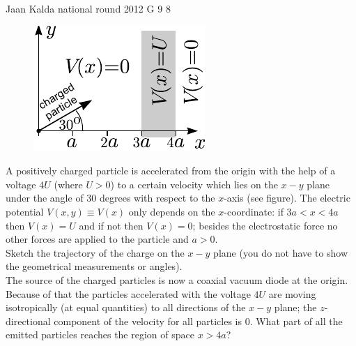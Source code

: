 \documentclass[11pt]{article}
\begin{document}
{Jaan Kalda} %
{national round} %
{2012} %
{G 9} %
{8} %
{

\ifEngStatement
\begin{figure}%
\vspace{-10pt}
\includegraphics[width=\linewidth]{2012-v3g-09-laeng_ing}%
\end{figure}
A positively charged particle is accelerated from the origin with the help of a voltage $4U$ (where $U>0$) to a certain velocity which lies on the $x-y$ plane under the angle of $30$ degrees with respect to the $x$-axis (see figure). The electric potential $V(x,y)\equiv V(x)$ only depends on the $x$-coordinate: if $3a<x<4a$ then $V(x)=U$ and if not then $V(x)=0$; besides the electrostatic force no other forces are applied to the particle and $a>0$.\\
\osa Sketch the trajectory of the charge on the $x-y$ plane (you do not have to show the geometrical measurements or angles).\\
\osa The source of the charged particles is now a coaxial vacuum diode at the origin. Because of that the particles accelerated with the voltage $4U$ are moving isotropically (at equal quantities) to all directions of the $x-y$ plane; the $z$-directional component of the velocity for all particles is 0. What part of all the emitted particles reaches the region of space $x>4a$?
\fi
}
\end{document}
